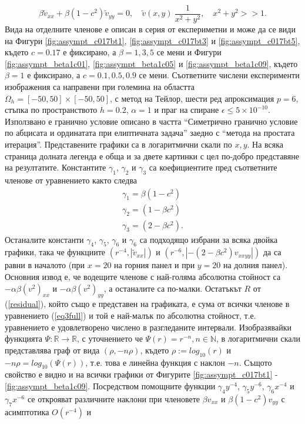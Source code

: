 \documentclass{article}
\newcommand{\be}{\begin{equation}}
\newcommand{\ee}{\end{equation}}
\newcommand{\rf}[1]{(\ref{#1})}
\newcommand{\RR}{\mathbb{R}}
\begin{document}
\be\label{asymptEq}
\beta \tilde v_{xx} + \beta (1-c^2) \tilde v_{yy} =0, \quad \tilde v(x,y) ~ \frac{1}{x^2 + y^2}, \quad x^2 + y^2 >>1.
\ee
Вида на отделните членове е описан в серия от експериметни и може да се види на Фигури \ref{fig:assympt_c017bt1}, \ref{fig:assympt_c017bt3} и \ref{fig:assympt_c017bt5}, където $c=0.17$ е фиксирано, а $\beta = 1, 3, 5$ се мени и Фигури \ref{fig:assympt_beta1c01}, \ref{fig:assympt_beta1c05} и \ref{fig:assympt_beta1c09}, където $\beta=1$ е фиксирано, а $c = 0.1, 0.5, 0.9$ се мени. Съответните числени експерименти изображения са направени при големина на областта $\Omega_h = [-50, 50] \times [-50, 50]$, с метод на Тейлор, шести ред апроксимация $p=6$, стъпка по пространството $h=0.2$, $\alpha = 1$ и праг на спиране $\epsilon \le 5 \times 10^{-10}$. Използвано е гранично условие описано в частта ``Симетрично гранично условие по абцисата и ординатата при елиптичната задача'' заедно с ``метода на простата итерация''. Представените графики са в логаритмични скали по $x,y$. На всяка страница долната легенда е обща и за двете картинки с цел по-добро представяне на резултатите. Константите $\gamma_1$, $\gamma_2$ и $\gamma_3$ са коефициентите пред съответните членове от уравнението както следва
\begin{align*}
\gamma_1 = \beta (1-c^2) \\
\gamma_2 = (1-\beta c^2) \\
\gamma_3 = (2-\beta c^2).
\end{align*}
Останалите константи $\gamma_4$, $\gamma_5$, $\gamma_6$ и $\gamma_6$ са подходящо избрани за всяка двойка графики, така че функциите $(r^{-4}, |\tilde v_{xx}|)$ и $(r^{-6}, |- (2-\beta c^2)v_{xxyy}|)$ да са равни в началото (при $x=20$ на горния панел и при $y=20$ на долния панел).
Основния извод е, че водещите членове с най-голяма абсолютна стойност са $- \alpha \beta (v^2)_{xx}$ и  $- \alpha \beta (v^2)_{yy}$, а останалите са по-малки. Остатъкът $R$ от \rf{residual}, който също е представен на графиката, е сума от всички членове в уравнението \rf{eq3full} и той е най-малък по абсолютна стойност, т.е. уравнението е удовлетворено числено в разгледаните интервали. 
Изобразявайки функцията $\Psi : \RR \rightarrow \RR$, с уточнението че $\Psi(r) = r^{-n}, n \in \mathbb{N}$, в логаритмични скали представлява граф от вида $(\rho, -n \rho )$, където $\rho := log_{10}(r)$ и $ -n \rho = log_{10}( \Psi(r) ) $, т.е. това е линейна функция с наклон $-n$. Същото свойство е видно и на всички графики от Фигурите \ref{fig:assympt_c017bt1} - \ref{fig:assympt_beta1c09}. Посредством помощните функции $\gamma_4 y^{-4}$, $\gamma_5 y^{-6}$, $\gamma_6 x^{-4}$ и $\gamma_7 x^{-6}$ се открояват различните наклони при членовете $\beta v_{xx}$ и $\beta (1-c^2) v_{yy}$ с асимптотика $O(r^{-4})$ и 
\end{document}
